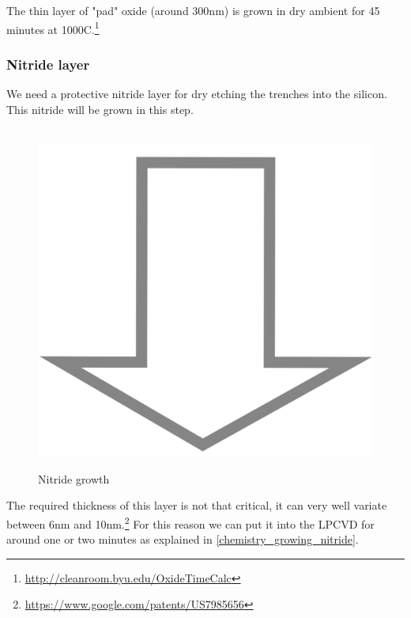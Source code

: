 The thin layer of "pad" oxide (around 300nm) is grown in dry ambient for 45 minutes at 1000\degree C.\footnote{\url{http://cleanroom.byu.edu/OxideTimeCalc}}

\subsubsection{Nitride layer}

We need a protective nitride layer for dry etching the trenches into the silicon. This nitride will be grown in this step.

\begin{figure}[H]
	\centering
	\begin{tikzpicture}[node distance = 3cm, auto, thick,scale=\CrossSectionOnly, every node/.style={transform shape}]
		
	\end{tikzpicture} \\
	\includegraphics[scale=0.01]{down_arrow.png} \\
	\begin{tikzpicture}[node distance = 3cm, auto, thick,scale=\CrossSectionOnly, every node/.style={transform shape}]
		
	\end{tikzpicture}
	\caption{Nitride growth}
\end{figure}

The required thickness of this layer is not that critical, it can very well variate between 6nm and 10nm.\footnote{\url{https://www.google.com/patents/US7985656}}
For this reason we can put it into the LPCVD for around one or two minutes as explained in \autoref{chemistry_growing_nitride}.

